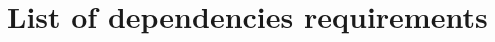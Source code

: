 
\newcommand{\A}{{\cal A}}
\newcommand{\h}{{\cal H}}
\newcommand{\s}{{\cal S}}
\newcommand{\W}{{\cal W}}
\newcommand{\BH}{\mathbf B(\cal H)}
\newcommand{\KH}{\cal  K(\cal H)}
\newcommand{\Real}{\mathbb R}
\newcommand{\Complex}{\mathbb C}
\newcommand{\Field}{\mathbb F}
\newcommand{\RPlus}{[0,\infty)}
%
\newcommand{\norm}[1]{\left\Vert#1\right\Vert}
\newcommand{\essnorm}[1]{\norm{#1}_{\text{\rm\normalshape ess}}}
\newcommand{\abs}[1]{\left\vert#1\right\vert}
\newcommand{\set}[1]{\left\{#1\right\}}
\newcommand{\seq}[1]{\left<#1\right>}
\newcommand{\eps}{\varepsilon}
\newcommand{\To}{\longrightarrow}
\newcommand{\RE}{\operatorname{Re}}
\newcommand{\IM}{\operatorname{Im}}
\newcommand{\Poly}{{\cal{P}}(E)}
\newcommand{\EssD}{{\cal{D}}}
\theoremstyle{plain}
\newtheorem{thm}{Theorem}[section]
\newtheorem{cor}[thm]{Corollary}
\newtheorem{lem}[thm]{Lemma}
\newtheorem{prop}[thm]{Proposition}

\theoremstyle{definition}
\newtheorem{defn}{Definition}[section]
%
\theoremstyle{remark}
\newtheorem{rem}{Remark}[section]
%
\def\baselinestretch{1}

\chapter{List of dependencies requirements}

\def\baselinestretch{1.66}

